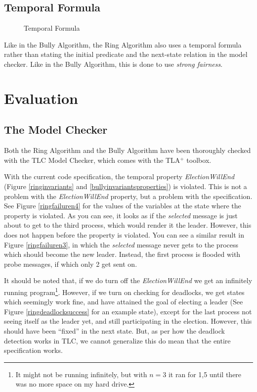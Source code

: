 \documentclass{report}
\begin{document}
\section{Temporal Formula}

\begin{figure}
  \tlatex
\@x{}\moduleLeftDash{}\moduleRightDash\@xx{}%
\@x{}\bottombar\@xx{}%
  \caption{Temporal Formula}
  \label{ringtemporalformula}
  \end{figure}

  Like in the Bully Algorithm, the Ring Algorithm also uses a temporal formula rather than stating the initial predicate and the next-state relation in the model checker. Like in the Bully Algorithm, this is done to use \textit{strong fairness}.

\chapter{Evaluation}
\section{The Model Checker}
Both the Ring Algorithm and the Bully Algorithm have been thoroughly checked with the TLC Model Checker, which comes with the TLA$^{+}$ toolbox.

With the current code specification, the temporal property \textit{ElectionWillEnd} (Figure \ref{ringinvariants} and \ref{bullyinvariantsproperties}) is violated. This is not a problem with the \textit{ElectionWillEnd} property, but a problem with the specification. See Figure \ref{ringfailuren4} for the values of the variables at the state where the property is violated. As you can see, it looks as if the \textit{selected} message is just about to get to the third process, which would render it the leader. However, this does not happen before the property is violated. You can see a similar result in Figure \ref{ringfailuren3}, in which the \textit{selected} message never gets to the process which should become the new leader. Instead, the first process is flooded with probe messages, if which only 2 get sent on.

It should be noted that, if we do turn off the \textit{ElectionWillEnd} we get an infinitely running program\footnote{It might not be running infinitely, but with $n = 3$ it ran for 1,5 until there was no more space on my hard drive.}. However, if we turn on checking for deadlocks, we get states which seemingly work fine, and have attained the goal of electing a leader (See Figure \ref{ringdeadlocksuccess} for an example state), except for the last process not seeing itself as the leader yet, and still participating in the election. However, this should have been ``fixed'' in the next state. But, as per how the deadlock detection works in TLC, we cannot generalize this do mean that the entire specification works.
\end{document}
